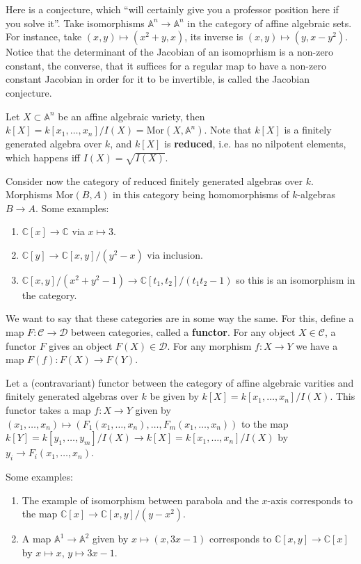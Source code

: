 \documentclass[12pt]{article}
\newcommand{\C}{\mathbb{C}}
\newcommand{\A}{\mathbb{A}}
\newcommand{\Mor}{\mathrm{Mor}}
\begin{document}
    Here is a conjecture, which ``will certainly give you a professor position here if you solve it''. Take isomorphisms $\A^n \to \A^n$ in the category of affine algebraic sets. For instance, take $(x, y) \mapsto (x^2 + y, x)$, its inverse is $(x, y) \mapsto (y, x-y^2)$. Notice that the determinant of the Jacobian of an isomoprhism is a non-zero constant, the converse, that it suffices for a regular map to have a non-zero constant Jacobian in order for it to be invertible, is called the Jacobian conjecture. \par
    Let $X\subset \A^n$ be an affine algebraic variety, then $k[X] = k[x_1, \dots, x_n]/I(X) = \Mor(X, \A^n)$. Note that $k[X]$ is a finitely generated algebra over $k$, and $k[X]$ is \textbf{reduced}, i.e. has no nilpotent elements, which happens iff $I(X) = \sqrt{I(X)}$. \par
    Consider now the category of reduced finitely generated algebras over $k$. Morphisms $\Mor(B, A)$ in this category being homomorphisms of $k$-algebras $B \to A$. Some examples:
    \begin{enumerate}
        \item $\C[x] \to \C$ via $x \mapsto 3$.
        \item $\C[y] \to \C[x, y]/(y^2 - x)$ via inclusion.
        \item $\C[x, y]/(x^2+y^2-1) \xrightarrow{} \C[t_1, t_2]/(t_1t_2 - 1)$ so this is an isomorphism in the category.
    \end{enumerate}
    We want to say that these categories are in some way the same. For this, define a map $F: \mathcal{C} \to \mathcal{D}$ between categories, called a \textbf{functor}. For any object $X \in \mathcal{C}$, a functor $F$ gives an object $F(X) \in \mathcal{D}$. For any morphism $f: X \to Y$ we have a map $F(f): F(X) \to F(Y)$. \par
    Let a (contravariant) functor between the category of affine algebraic varities and finitely generated algebras over $k$ be given by $k[X] = k[x_1, \dots, x_n]/I(X)$. This functor takes a map $f: X \to Y$ given by $(x_1, \dots, x_n) \mapsto (F_1(x_1, \dots, x_n), \dots, F_m(x_1, \dots, x_n))$ to the map $k[Y] = k[y_1, \dots, y_m]/I(X) \to k[X] = k[x_1, \dots, x_n]/I(X)$ by $y_i \to F_i(x_1, \dots, x_n)$. \par
    Some examples:
    \begin{enumerate}
        \item The example of isomorphism between parabola and the $x$-axis corresponds to the map $\C[x] \to \C[x, y]/(y-x^2)$.
        \item A map $\A^1 \to \A^2$ given by $x \mapsto (x, 3x-1)$ corresponds to $\C[x, y] \to \C[x]$ by $x \mapsto x$, $y \mapsto 3x-1$.
    \end{enumerate}
\end{document}
